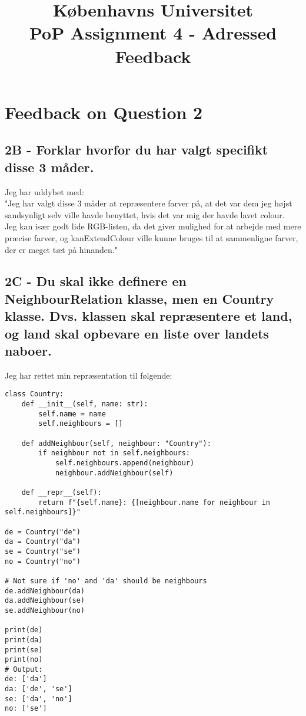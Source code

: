 \documentclass[a4paper,12pt]{article}
\begin{document}
% 

\title{Københavns Universitet\\
PoP Assignment 4 - Adressed Feedback}
\maketitle %

\section{Feedback on Question 2}

\subsection*{2B - Forklar hvorfor du har valgt specifikt disse 3 måder.}
Jeg har uddybet med:\\
"Jeg har valgt disse 3 måder at repræsentere farver på, at det var dem jeg højst sandsynligt selv ville havde benyttet, hvis det var mig der havde lavet colour.\\
Jeg kan især godt lide RGB-listen, da det giver mulighed for at arbejde med mere præcise farver, og kanExtendColour ville kunne bruges til at sammenligne farver, der er meget tæt på hinanden."


\subsection*{2C - Du skal ikke definere en NeighbourRelation klasse, men en Country klasse. Dvs. klassen skal repræsentere et land, og land skal opbevare en liste over landets naboer.}
Jeg har rettet min repræsentation til følgende:

\begin{lstlisting}
class Country:
    def __init__(self, name: str):
        self.name = name
        self.neighbours = []

    def addNeighbour(self, neighbour: "Country"):
        if neighbour not in self.neighbours:
            self.neighbours.append(neighbour)
            neighbour.addNeighbour(self)

    def __repr__(self):
        return f"{self.name}: {[neighbour.name for neighbour in self.neighbours]}"

de = Country("de")
da = Country("da")
se = Country("se")
no = Country("no")

# Not sure if 'no' and 'da' should be neighbours
de.addNeighbour(da)
da.addNeighbour(se)
se.addNeighbour(no)

print(de)
print(da)
print(se)
print(no)
# Output:
de: ['da']
da: ['de', 'se']
se: ['da', 'no']
no: ['se']
\end{lstlisting}
\end{document}
